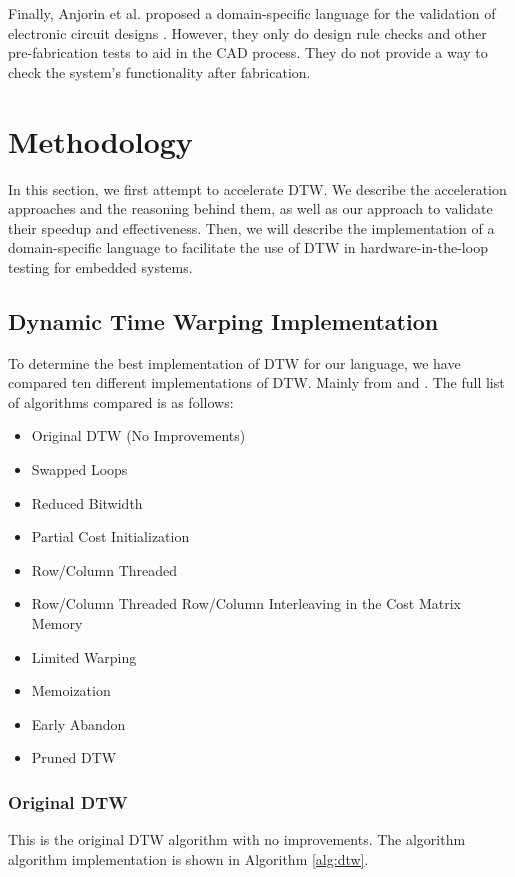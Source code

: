 \documentclass[sigconf,authordraft]{acmart}
\begin{document}
Finally, Anjorin et al. proposed a domain-specific language for the validation of electronic circuit designs \cite{DSL:Circuits}. However, they only do design rule checks and other pre-fabrication tests to aid in the CAD process. They do not provide a way to check the system's functionality after fabrication.

\section{Methodology}
In this section, we first attempt to accelerate DTW. We describe the acceleration approaches and the reasoning behind them, as well as our approach to validate their speedup and effectiveness. Then, we will describe the implementation of a domain-specific language to facilitate the use of DTW in hardware-in-the-loop testing for embedded systems.

\subsection{Dynamic Time Warping Implementation}

To determine the best implementation of DTW for our language, we have compared ten different implementations of DTW. Mainly from \cite{SIG:AccelerateDTW} and \cite{SIG:PruneDTW}. The full list of algorithms compared is as follows:

\begin{itemize}
    \item Original DTW (No Improvements)
    \item Swapped Loops
    \item Reduced Bitwidth
    \item Partial Cost Initialization
    \item Row/Column Threaded
    \item Row/Column Threaded Row/Column Interleaving in the Cost Matrix Memory
    \item Limited Warping
    \item Memoization
    \item Early Abandon
    \item Pruned DTW
\end{itemize}

\subsubsection{Original DTW}
This is the original DTW algorithm with no improvements. The algorithm algorithm implementation is shown in Algorithm \ref{alg:dtw}.
\end{document}
